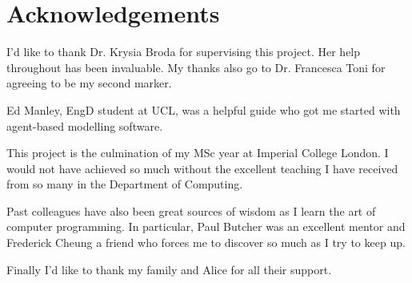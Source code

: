 \section*{Acknowledgements}

I'd like to thank Dr. Krysia Broda for supervising this project. Her help throughout has been invaluable. My thanks also go to Dr. Francesca Toni for agreeing to be my second marker.

Ed Manley, EngD student at UCL, was a helpful guide who got me started with agent-based modelling software.

This project is the culmination of my MSc year at Imperial College London. I would not have achieved so much without the excellent teaching I have received from so many in the Department of Computing.

Past colleagues have also been great sources of wisdom as I learn the art of computer programming. In particular, Paul Butcher was an excellent mentor and Frederick Cheung a friend who forces me to discover so much as I try to keep up.

Finally I'd like to thank my family and Alice for all their support.